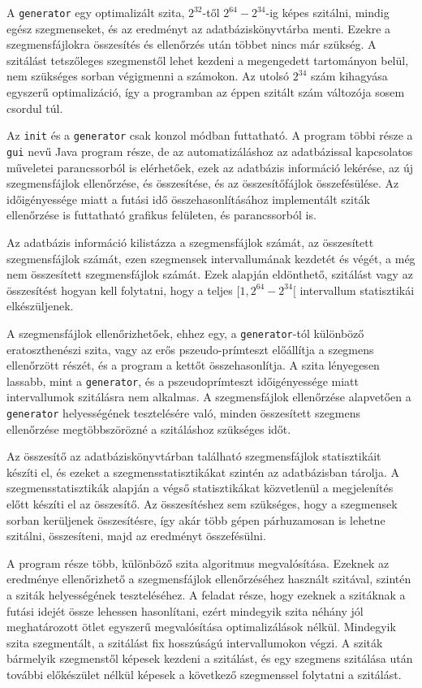 A \texttt{generator} egy optimalizált szita, $2^{32}$-től $2^{64}-2^{34}$-ig képes szitálni, mindig egész szegmenseket, és az eredményt az adatbáziskönyvtárba menti.
Ezekre a szegmensfájlokra összesítés és ellenőrzés után többet nincs már szükség.
A szitálást tetszőleges szegmenstől lehet kezdeni a megengedett tartományon belül, nem szükséges sorban végigmenni a számokon.
Az utolsó $2^{34}$ szám kihagyása egyszerű optimalizáció, így a programban az éppen szitált szám változója sosem csordul túl.

Az \texttt{init} és a \texttt{generator} csak konzol módban futtatható.
A program többi része a \texttt{gui} nevű Java program része, de az automatizáláshoz az adatbázissal kapcsolatos műveletei parancssorból is elérhetőek, ezek az adatbázis információ lekérése, az új szegmensfájlok ellenőrzése, és összesítése, és az összesítőfájlok összefésülése.
Az időigényessége miatt a futási idő összehasonlításához implementált sziták ellenőrzése is futtatható grafikus felületen, és parancssorból is.

Az adatbázis információ kilistázza a szegmensfájlok számát, az összesített szegmensfájlok számát, ezen szegmensek intervallumának kezdetét és végét, a még nem összesített szegmensfájlok számát.
Ezek alapján eldönthető, szitálást vagy az összesítést hogyan kell folytatni, hogy a teljes $[1, 2^{64}-2^{34}[$ intervallum statisztikái elkészüljenek.

A szegmensfájlok ellenőrizhetőek, ehhez egy, a \texttt{generator}-tól különböző eratoszthenészi szita, vagy az erős pszeudo-prímteszt\cite{pseudoprime}\cite{pseudoprimebase} előállítja a szegmens ellenőrzött részét, és a program a kettőt összehasonlítja.
A szita lényegesen lassabb, mint a \texttt{generator}, és a pszeudoprímteszt időigényessége miatt intervallumok szitálásra nem alkalmas.
A szegmensfájlok ellenőrzése alapvetően a \texttt{generator} helyességének tesztelésére való, minden összesített szegmens ellenőrzése megtöbbszörözné a szitáláshoz szükséges időt.

Az összesítő az adatbáziskönyvtárban található szegmensfájlok statisztikáit készíti el, és ezeket a szegmensstatisztikákat szintén az adatbázisban tárolja.
A szegmensstatisztikák alapján a végső statisztikákat közvetlenül a megjelenítés előtt készíti el az összesítő.
Az összesítéshez sem szükséges, hogy a szegmensek sorban kerüljenek összesítésre, így akár több gépen párhuzamosan is lehetne szitálni, összesíteni, majd az eredményt összefésülni.

A program része több, különböző szita algoritmus megvalósítása.
Ezeknek az eredménye ellenőrizhető a szegmensfájlok ellenőrzéséhez használt szitával, szintén a sziták helyességének teszteléséhez.
A feladat része, hogy ezeknek a szitáknak a futási idejét össze lehessen hasonlítani, ezért mindegyik szita néhány jól meghatározott ötlet egyszerű megvalósítása optimalizálások nélkül.
Mindegyik szita szegmentált, a szitálást fix hosszúságú intervallumokon végzi.
A sziták bármelyik szegmenstől képesek kezdeni a szitálást, és egy szegmens szitálása után további előkészület nélkül képesek a következő szegmenssel folytatni a szitálást.

